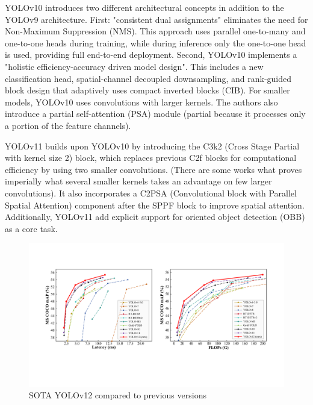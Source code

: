 \documentclass[12pt, a4paper]{article}
\begin{document}
YOLOv10 \cite{yolov10} introduces two different architectural concepts in addition to the YOLOv9 architecture.
First: "consistent dual assignments" eliminates the need for Non-Maximum Suppression (NMS). This approach uses parallel one-to-many and one-to-one heads during training, while during inference only the one-to-one head is used, providing full end-to-end deployment.
Second, YOLOv10 implements a "holistic efficiency-accuracy driven model design". This includes a new classification head, spatial-channel decoupled downsampling, and rank-guided block design that adaptively uses compact inverted blocks (CIB). For smaller models, YOLOv10 uses convolutions with larger kernels. The authors also introduce a partial self-attention (PSA) module (partial because it processes only a portion of the feature channels).

YOLOv11 \cite{yolov11} builds upon YOLOv10 by introducing the C3k2 (Cross Stage Partial with kernel size 2) block, which replaces previous C2f blocks for computational efficiency by using two smaller convolutions. (There are some works what proves imperially what several smaller kernels takes an advantage on few larger convolutions). It also incorporates a C2PSA (Convolutional block with Parallel Spatial Attention) component after the SPPF block to improve spatial attention. Additionally, YOLOv11 add explicit support for oriented object detection (OBB) as a core task.

\begin{figure}[h]
    \centering
    \includegraphics[width=0.95\linewidth]{pictures/yolov12.pdf}
    \caption{SOTA YOLOv12 compared to previous versions}
    \label{fig:yolov12}
\end{figure}
\end{document}

